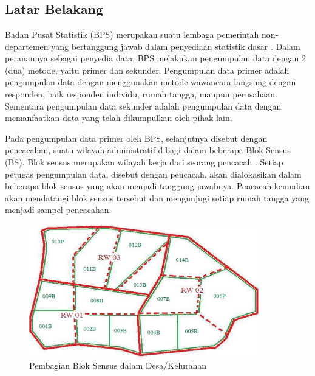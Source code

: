 \chapter{\babSatu}

\section{Latar Belakang}

Badan Pusat Statistik (BPS) merupakan suatu lembaga pemerintah non-departemen yang bertanggung jawab dalam penyediaan statistik dasar \citep{bps_badan_2016}. Dalam peranannya sebagai penyedia data, BPS melakukan pengumpulan data dengan 2 (dua) metode, yaitu primer dan sekunder. Pengumpulan data primer adalah pengumpulan data dengan menggunakan metode wawancara langsung dengan responden, baik responden individu, rumah tangga, maupun perusahaan. Sementara pengumpulan data sekunder adalah pengumpulan data dengan memanfaatkan data yang telah dikumpulkan oleh pihak lain.


Pada pengumpulan data primer oleh BPS, selanjutnya disebut dengan pencacahan, suatu wilayah administratif dibagi dalam beberapa Blok Sensus (BS). Blok sensus merupakan wilayah kerja dari seorang pencacah \citep{bps_sistem_2016}. Setiap petugas pengumpulan data, disebut dengan pencacah, akan dialokasikan dalam beberapa blok sensus yang akan menjadi tanggung jawabnya. Pencacah kemudian akan mendatangi blok sensus tersebut dan mengunjugi setiap rumah tangga yang menjadi sampel pencacahan.


\begin{figure}[h]
    \centering
    \includegraphics[width=10cm]{../../Resources/Images/peta_kelurahan_per_bs}
    \caption{Pembagian Blok Sensus dalam Desa/Kelurahan}
    \label{fig:capi-ilustration}
\end{figure}


